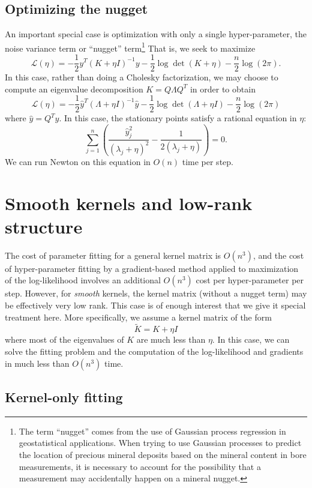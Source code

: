 \documentclass[12pt, leqno]{article} %
\begin{document}
\subsection{Optimizing the nugget}

An important special case is optimization with only a single
hyper-parameter, the noise variance term or ``nugget''
term\footnote{The term ``nugget'' comes from the use of Gaussian
  process regression in geostatistical applications.  When trying
  to use Gaussian processes to predict the location of precious
  mineral deposits based on the mineral content in bore measurements,
  it is necessary to account for the possibility that a measurement
  may accidentally happen on a mineral nugget.}
That is, we seek to maximize
\[
  \mathcal{L}(\eta) =
    -\frac{1}{2} y^T (K + \eta I)^{-1} y - \frac{1}{2} \log \det (K + \eta) -
     \frac{n}{2} \log(2\pi).
\]
In this case, rather than doing a Cholesky factorization, we may
choose to compute an eigenvalue decomposition $K = Q \Lambda Q^T$
in order to obtain
\[
  \mathcal{L}(\eta) =
    -\frac{1}{2} \hat{y}^T (\Lambda + \eta I)^{-1} \hat{y}
    -\frac{1}{2} \log \det (\Lambda + \eta I) -
    \frac{n}{2} \log(2\pi)
\]
where $\hat{y} = Q^T y$.  In this case, the stationary points
satisfy a rational equation in $\eta$:
\[
\sum_{j=1}^n \left( \frac{\hat{y}_j^2}{(\lambda_j + \eta)^2}
                 - \frac{1}{2 (\lambda_j + \eta)} \right) = 0.
\]
We can run Newton on this equation in $O(n)$ time per step.

\section{Smooth kernels and low-rank structure}

The cost of parameter fitting for a general kernel matrix is $O(n^3)$,
and the cost of hyper-parameter fitting by a gradient-based method
applied to maximization of the log-likelihood involves an
additional $O(n^3)$ cost per hyper-parameter per step.  However,
for {\em smooth} kernels, the kernel matrix (without a nugget term)
may be effectively very low rank.  This case is of enough interest
that we give it special treatment here.  More specifically, we assume
a kernel matrix of the form
\[
  \tilde{K} = K + \eta I
\]
where most of the eigenvalues of $K$ are much less than $\eta$.  In
this case, we can solve the fitting problem and the computation of the
log-likelihood and gradients in much less than $O(n^3)$ time.

\subsection{Kernel-only fitting}
\end{document}
